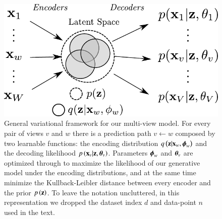 \begin{figure}[htbp]
\centering
\includegraphics[width=\columnwidth]{./tex/fig/architecture.pdf}
\caption{
General variational framework for our multi-view model.
For every pair of views $v$ and $w$ there is a prediction path $v \leftarrow w$ composed by two learnable functions: the encoding distribution $q\left(\mathbf{z}|\mathbf{x}_w, \boldsymbol{\phi}_w\right)$ and the decoding likelihood $p\left(\mathbf{x}_v|\mathbf{z}, \boldsymbol{\theta}_v\right)$.
Parameters $\boldsymbol{\phi}_w$ and $\boldsymbol{\theta}_v$ are optimized through  to maximize the likelihood of our generative model under the encoding distributions, and at the same time minimize the Kullback-Leibler distance between every encoder and the prior $p\left(\mathbf{z}\right)$.
To leave the notation uncluttered, in this representation we dropped the dataset index $d$ and data-point $n$ used in the text.
}
\label{fig:architecture}
\end{figure}
